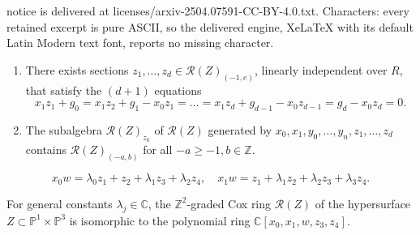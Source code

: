 \documentclass[10pt,a4paper]{amsart}
\newcommand{\C}{\mathbb{C}}
\newcommand{\R}{\mathcal{R}}
\newcommand{\Z}{\mathbb{Z}}
\newcommand{\p}{\mathbb{P}}
\begin{document}
notice is delivered at licenses/arxiv-2504.07591-CC-BY-4.0.txt. Characters: every retained excerpt is pure ASCII, so the delivered engine, XeLaTeX with its default Latin Modern text font, reports no missing character.
\begin{proposition}\label{prop:z_k}
\begin{enumerate} \item[(i)] There exists sections $z_1, \dots, z_d \in \R(Z)_{(-1,e)}$, linearly independent over $R$, that satisfy the $(d+1)$ equations
\begin{equation}
    x_1 z_1 + g_0 = x_1 z_{2} + g_{1} - x_0 z_{1} = \dots = x_1 z_{d} + g_{d-1} - x_0 z_{d-1} = g_d - x_0 z_d = 0.
    \label{eq:coxz}
\end{equation}
\item[(ii)]The subalgebra $\R(Z)_{z_k}$ of $\R(Z)$ generated by $x_0, x_1, y_0, \dots, y_n, z_1, \dots, z_d$ contains $\R(Z)_{(-a,b)}$ for all $-a \geqslant -1, b \in \Z$.\end{enumerate}
\label{prop:coxz1}
\end{proposition}

\begin{equation}\label{eq:linear}
       x_0 w = \lambda_0 z_1 + z_2 +\lambda_1 z_3 +\lambda_2 z_4, \quad x_1 w = z_1 + \lambda_1 z_2+ \lambda_2 z_3 +\lambda_3 z_4  .
\end{equation}

\begin{proposition}\label{prop:linear}
         For general constants $\lambda_j\in\C$, the $\Z^2$-graded Cox ring $\R(Z)$ of the hypersurface $Z \subset \p^1 \times \p^3$ is isomorphic to the polynomial ring $\C[x_0,x_1,w,z_3,z_4]$.    
\end{proposition}
\end{document}
